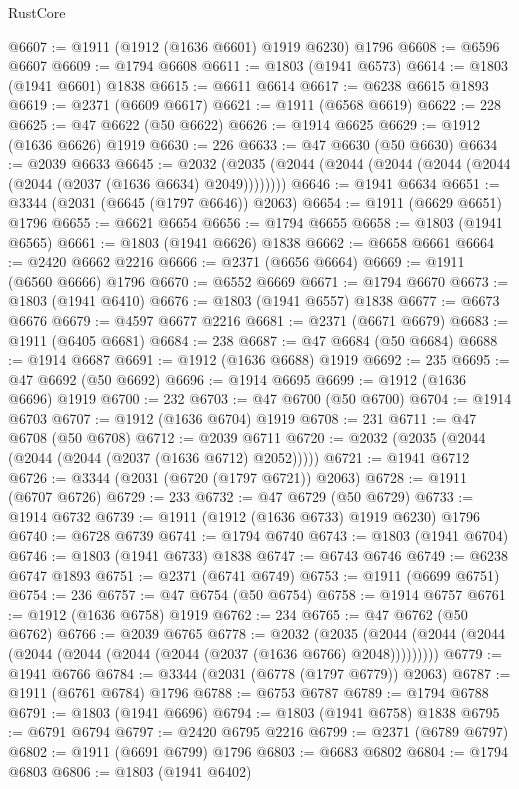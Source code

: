 \begin{lexlean}{RustCore}
\begin{coremodule}
@6607 := @1911 (@1912 (@1636 @6601) @1919 @6230) @1796
@6608 := @6596 @6607
@6609 := @1794 @6608
@6611 := @1803 (@1941 @6573)
@6614 := @1803 (@1941 @6601) @1838
@6615 := @6611 @6614
@6617 := @6238 @6615 @1893
@6619 := @2371 (@6609 @6617)
@6621 := @1911 (@6568 @6619)
@6622 := 228
@6625 := @47 @6622 (@50 @6622)
@6626 := @1914 @6625
@6629 := @1912 (@1636 @6626) @1919
@6630 := 226
@6633 := @47 @6630 (@50 @6630)
@6634 := @2039 @6633
@6645 := @2032 (@2035 (@2044 (@2044 (@2044 (@2044 (@2044 (@2044 (@2037 (@1636 @6634) @2049))))))))
@6646 := @1941 @6634
@6651 := @3344 (@2031 (@6645 (@1797 @6646)) @2063)
@6654 := @1911 (@6629 @6651) @1796
@6655 := @6621 @6654
@6656 := @1794 @6655
@6658 := @1803 (@1941 @6565)
@6661 := @1803 (@1941 @6626) @1838
@6662 := @6658 @6661
@6664 := @2420 @6662 @2216
@6666 := @2371 (@6656 @6664)
@6669 := @1911 (@6560 @6666) @1796
@6670 := @6552 @6669
@6671 := @1794 @6670
@6673 := @1803 (@1941 @6410)
@6676 := @1803 (@1941 @6557) @1838
@6677 := @6673 @6676
@6679 := @4597 @6677 @2216
@6681 := @2371 (@6671 @6679)
@6683 := @1911 (@6405 @6681)
@6684 := 238
@6687 := @47 @6684 (@50 @6684)
@6688 := @1914 @6687
@6691 := @1912 (@1636 @6688) @1919
@6692 := 235
@6695 := @47 @6692 (@50 @6692)
@6696 := @1914 @6695
@6699 := @1912 (@1636 @6696) @1919
@6700 := 232
@6703 := @47 @6700 (@50 @6700)
@6704 := @1914 @6703
@6707 := @1912 (@1636 @6704) @1919
@6708 := 231
@6711 := @47 @6708 (@50 @6708)
@6712 := @2039 @6711
@6720 := @2032 (@2035 (@2044 (@2044 (@2044 (@2037 (@1636 @6712) @2052)))))
@6721 := @1941 @6712
@6726 := @3344 (@2031 (@6720 (@1797 @6721)) @2063)
@6728 := @1911 (@6707 @6726)
@6729 := 233
@6732 := @47 @6729 (@50 @6729)
@6733 := @1914 @6732
@6739 := @1911 (@1912 (@1636 @6733) @1919 @6230) @1796
@6740 := @6728 @6739
@6741 := @1794 @6740
@6743 := @1803 (@1941 @6704)
@6746 := @1803 (@1941 @6733) @1838
@6747 := @6743 @6746
@6749 := @6238 @6747 @1893
@6751 := @2371 (@6741 @6749)
@6753 := @1911 (@6699 @6751)
@6754 := 236
@6757 := @47 @6754 (@50 @6754)
@6758 := @1914 @6757
@6761 := @1912 (@1636 @6758) @1919
@6762 := 234
@6765 := @47 @6762 (@50 @6762)
@6766 := @2039 @6765
@6778 := @2032
    (@2035 (@2044 (@2044 (@2044 (@2044 (@2044 (@2044 (@2044 (@2037 (@1636 @6766) @2048)))))))))
@6779 := @1941 @6766
@6784 := @3344 (@2031 (@6778 (@1797 @6779)) @2063)
@6787 := @1911 (@6761 @6784) @1796
@6788 := @6753 @6787
@6789 := @1794 @6788
@6791 := @1803 (@1941 @6696)
@6794 := @1803 (@1941 @6758) @1838
@6795 := @6791 @6794
@6797 := @2420 @6795 @2216
@6799 := @2371 (@6789 @6797)
@6802 := @1911 (@6691 @6799) @1796
@6803 := @6683 @6802
@6804 := @1794 @6803
@6806 := @1803 (@1941 @6402)

\end{coremodule}
\end{lexlean}
